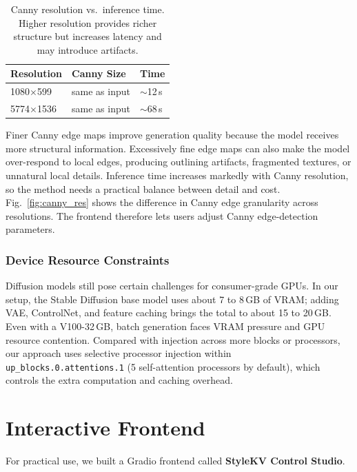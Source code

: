 \documentclass[10pt,twocolumn]{article}
\begin{document}
\begin{table}[htbp]
  \centering
  \caption{Canny resolution vs.\ inference time. Higher resolution provides richer structure but increases latency and may introduce artifacts.}
  \label{tab:resolution_canny}
  \small
  \begin{tabular}{lll}
    \toprule
    Resolution & Canny Size & Time \\
    \midrule
    1080$\times$599   & same as input & $\sim$12\,s \\
    5774$\times$1536  & same as input & $\sim$68\,s \\
    \bottomrule
  \end{tabular}
\end{table}

Finer Canny edge maps improve generation quality because the model receives more structural information. Excessively fine edge maps can also make the model over-respond to local edges, producing outlining artifacts, fragmented textures, or unnatural local details. Inference time increases markedly with Canny resolution, so the method needs a practical balance between detail and cost. Fig.~\ref{fig:canny_res} shows the difference in Canny edge granularity across resolutions. The frontend therefore lets users adjust Canny edge-detection parameters.

\subsubsection{Device Resource Constraints}

Diffusion models still pose certain challenges for consumer-grade GPUs. In our setup, the Stable Diffusion base model uses about 7 to 8\,GB of VRAM; adding VAE, ControlNet, and feature caching brings the total to about 15 to 20\,GB. Even with a V100-32\,GB, batch generation faces VRAM pressure and GPU resource contention. Compared with injection across more blocks or processors, our approach uses selective processor injection within \texttt{up\_blocks.0.attentions.1} (5 self-attention processors by default), which controls the extra computation and caching overhead.

\section{Interactive Frontend}

For practical use, we built a Gradio frontend called \textbf{StyleKV Control Studio}.
\end{document}
